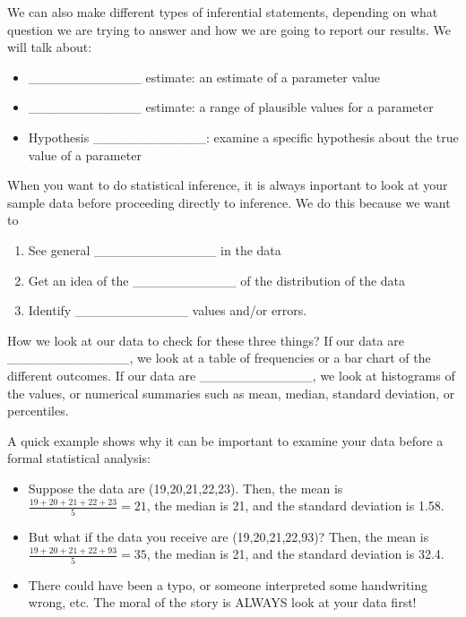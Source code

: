 \documentclass[]{book}
\providecommand{\tightlist}{%
  \setlength{\itemsep}{0pt}\setlength{\parskip}{0pt}}
\theoremstyle{definition}
\theoremstyle{definition}
\theoremstyle{remark}
\begin{document}
We can also make different types of inferential statements, depending on
what question we are trying to answer and how we are going to report our
results. We will talk about:

\begin{itemize}
\tightlist
\item
  \_\_\_\_\_\_\_\_\_\_\_\_ estimate: an estimate of a parameter value
  \vspace{.1in}
\item
  \_\_\_\_\_\_\_\_\_\_\_\_ estimate: a range of plausible values for a
  parameter \vspace{.1in}
\item
  Hypothesis \_\_\_\_\_\_\_\_\_\_\_\_: examine a specific hypothesis
  about the true value of a parameter
\end{itemize}

When you want to do statistical inference, it is always inportant to
look at your sample data before proceeding directly to inference. We do
this because we want to

\begin{enumerate}
\def\labelenumi{\arabic{enumi}.}
\tightlist
\item
  See general \_\_\_\_\_\_\_\_\_\_\_\_\_ in the data \vspace{.1in}
\item
  Get an idea of the \_\_\_\_\_\_\_\_\_\_\_ of the distribution of the
  data \vspace{.1in}
\item
  Identify \_\_\_\_\_\_\_\_\_\_\_\_ values and/or errors.
\end{enumerate}

How we look at our data to check for these three things? If our data are
\_\_\_\_\_\_\_\_\_\_\_\_\_, we look at a table of frequencies or a bar
chart of the different outcomes. If our data are
\_\_\_\_\_\_\_\_\_\_\_\_, we look at histograms of the values, or
numerical summaries such as mean, median, standard deviation, or
percentiles.

A quick example shows why it can be important to examine your data
before a formal statistical analysis:

\begin{itemize}
\tightlist
\item
  Suppose the data are (19,20,21,22,23). Then, the mean is
  \(\frac{19+20+21+22+23}{5} = 21\), the median is 21, and the standard
  deviation is 1.58.
\item
  But what if the data you receive are (19,20,21,22,93)? Then, the mean
  is \(\frac{19+20+21+22+93}{5} = 35\), the median is 21, and the
  standard deviation is 32.4.
\item
  There could have been a typo, or someone interpreted some handwriting
  wrong, etc. The moral of the story is ALWAYS look at your data first!
\end{itemize}
\end{document}
